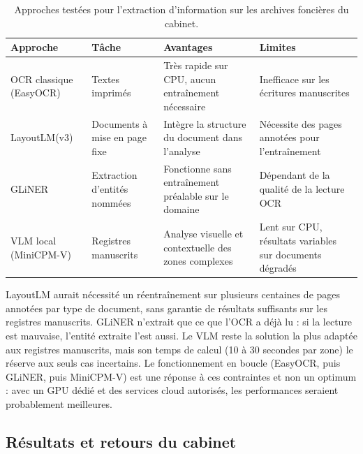 \begin{table}[H]
  \centering
  \caption{Approches testées pour l'extraction d'information sur les archives foncières du cabinet.}
  \label{tab:comparatif_approches}
  \small
  \begin{tabular}{p{3.2cm}p{3cm}p{3cm}p{3cm}}
    \toprule
    \textbf{Approche} & \textbf{Tâche} & \textbf{Avantages} & \textbf{Limites} \\
    \midrule
    OCR classique (EasyOCR) & Textes imprimés & Très rapide sur CPU, aucun entraînement nécessaire & Inefficace sur les écritures manuscrites \\
    \addlinespace
    LayoutLM(v3) & Documents à mise en page fixe & Intègre la structure du document dans l'analyse & Nécessite des pages annotées pour l'entraînement \\
    \addlinespace
    GLiNER & Extraction d'entités nommées & Fonctionne sans entraînement préalable sur le domaine & Dépendant de la qualité de la lecture OCR \\
    \addlinespace
    VLM local (MiniCPM-V) & Registres manuscrits & Analyse visuelle et contextuelle des zones complexes & Lent sur CPU, résultats variables sur documents dégradés \\
    \bottomrule
  \end{tabular}
\end{table}

LayoutLM aurait nécessité un réentraînement sur plusieurs centaines de pages annotées par type de document, sans garantie de résultats suffisants sur les registres manuscrits. GLiNER n'extrait que ce que l'OCR a déjà lu : si la lecture est mauvaise, l'entité extraite l'est aussi. Le VLM reste la solution la plus adaptée aux registres manuscrits, mais son temps de calcul (10 à 30 secondes par zone) le réserve aux seuls cas incertains. Le fonctionnement en boucle (EasyOCR, puis GLiNER, puis MiniCPM-V) est une réponse à ces contraintes et non un optimum : avec un GPU dédié et des services cloud autorisés, les performances seraient probablement meilleures.


\subsection{Résultats et retours du cabinet}

